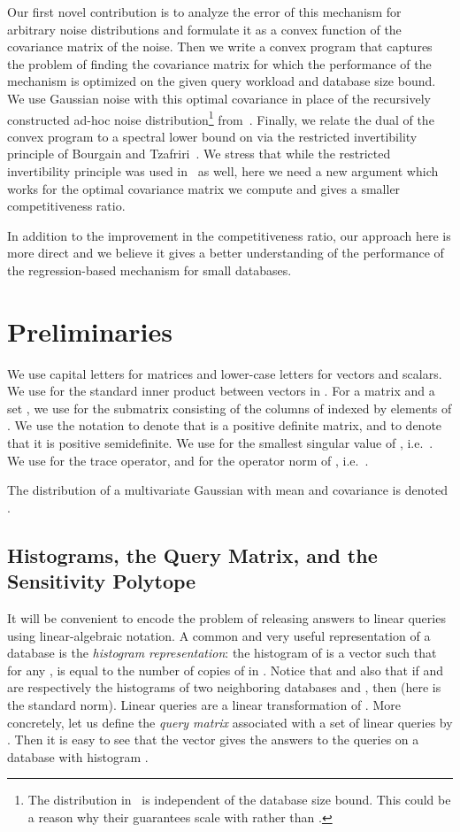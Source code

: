 \documentclass{article}
\begin{document}
Our first novel contribution is to analyze the error of this mechanism
for arbitrary noise distributions and formulate it as a convex
function of the covariance matrix of the noise. Then we write a convex
program that captures the problem of finding the covariance matrix for
which the performance of the mechanism is optimized on the given query
workload and database size bound. We use Gaussian noise with this
optimal covariance in place of the recursively constructed ad-hoc
noise distribution\footnote{The distribution in~\cite{NTZ} is
  independent of the database size bound. This could be a reason why
  their guarantees scale with  rather than .}
from~\cite{NTZ}. Finally, we relate the dual of the convex program to
a spectral lower bound on  via the restricted
invertibility principle of Bourgain and Tzafriri~\cite{bour-tza}. We
stress that while the restricted invertibility principle was used
in~\cite{NTZ} as well, here we need a new argument which works for the
optimal covariance matrix we compute and gives a smaller
competitiveness ratio.

In addition to the improvement in the competitiveness ratio, our
approach here is more direct and we believe it gives a better
understanding of the performance of the regression-based mechanism for
small databases.

\section{Preliminaries}

We use capital letters for matrices and lower-case letters for vectors
and scalars. We use  for the standard
inner product between vectors in . For a matrix  and a set , we use  for the
submatrix consisting of the columns of  indexed by elements of
. We use the notation  to denote that  is a positive
definite matrix, and  to denote that it is positive
semidefinite. We use  for the smallest singular
value of , i.e.~. We use  for the trace operator, and
 for the  operator norm of ,
i.e.~.

The distribution of a multivariate Gaussian
with mean  and covariance  is denoted .

\subsection{Histograms, the Query Matrix, and the Sensitivity Polytope}

It will be convenient to encode the problem of releasing answers to
linear queries using linear-algebraic notation. A common and very
useful representation of a database  is the
\emph{histogram representation}: the histogram of  is a vector  such that for any ,  is equal to
the number of copies of  in . Notice that  and
also that if  and  are respectively the histograms of two
neighboring databases  and , then  (here
 is the standard 
norm). Linear queries are a linear transformation of . More
concretely, let us define the \emph{query matrix}  associated with a set of linear queries  by
. Then it is easy to see that the vector 
gives the answers to the queries  on a database  with
histogram .
\end{document}
